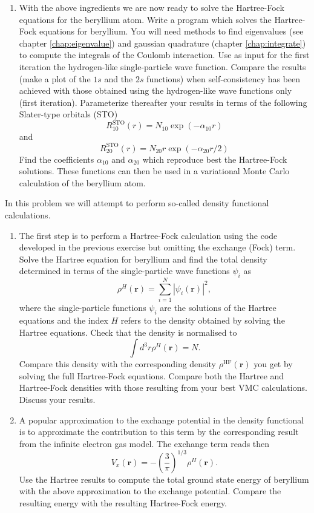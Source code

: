 \begin{prob}
\begin{enumerate}
\item With the above ingredients we are now ready to solve 
the Hartree-Fock equations  for the beryllium atom.  
Write a program which solves the Hartree-Fock equations for beryllium.
You will need methods to find eigenvalues (see chapter \ref{chap:eigenvalue}) and
gaussian quadrature (chapter \ref{chap:integrate}) 
to compute the integrals of the Coulomb interaction.
Use as input for the first 
iteration the hydrogen-like single-particle wave function.
Compare the results (make a plot of the $1s$ and the $2s$ functions) 
when self-consistency has been achieved 
with those obtained using the hydrogen-like wave functions only (first iteration).
Parameterize thereafter your results in terms of the following Slater-type orbitals (STO)
\[
R^{\mathrm{STO}}_{10}(r)=N_{10}\exp{(-\alpha_{10}r)}
\]
and
\[
R^{\mathrm{STO}}_{20}(r)=N_{20}r\exp{(-\alpha_{20}r/2)}
\]
Find the coefficients $\alpha_{10}$ and $\alpha_{20}$  which reproduce best the Hartree-Fock solutions.
These functions can then be used in a  variational Monte Carlo calculation of the beryllium atom. 
\end{enumerate}
\end{prob}

\begin{prob}
In this problem we will attempt to perform so-called density functional calculations.
\begin{enumerate}
\item
The first step is to perform a Hartree-Fock calculation using the code developed in the previous
exercise but omitting the exchange (Fock) term. Solve the Hartree equation for beryllium
and find the total density determined in terms of the single-particle wave functions
$\psi_i$ as
\[
\rho^H(\mathbf{r})=\sum_{i=1}^N|\psi_i(\mathbf{r})|^2,
\]
where the single-particle functions $\psi_i$ are the solutions of the Hartree equations and the index
$H$ refers to the density obtained by solving the Hartree equations.
Check that the density is normalised to
\[
\int d^3 r \rho^H(\mathbf{r}) = N.
\]
Compare this density with the corresponding density $\rho^{\mathrm{HF}}(\mathbf{r})$ 
you get by solving the full Hartree-Fock equations.
Compare both the Hartree and Hartree-Fock densities with those resulting from your best
VMC calculations. Discuss your results.

\item  A popular approximation to the exchange potential in the density functional is to
approximate the contribution to this term by the corresponding result from the infinite electron gas
model.  The exchange term reads then
\[
V_x(\mathbf{r})=-\left(\frac{3}{\pi}\right)^{1/3}\rho^H(\mathbf{r}).
\]
Use the Hartree results to compute the total ground state energy of beryllium with the above approximation
to the exchange potential.
Compare the resulting energy with the resulting Hartree-Fock energy.
\end{enumerate}
\end{prob}

